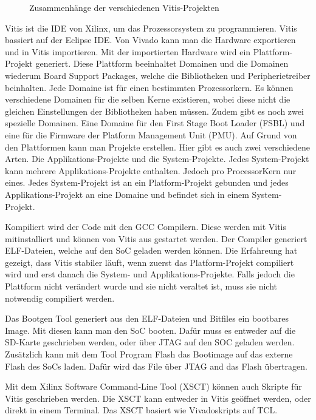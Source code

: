 \documentclass{article}
\begin{document}
\begin{figure}[tb]
    \caption{Zusammenhänge der verschiedenen Vitis-Projekten}
    \label{fig:vitis}
\end{figure}

Vitis ist die IDE von Xilinx, um das Prozessorsystem zu programmieren. Vitis bassiert auf der Eclipse IDE. 
Von Vivado kann man die Hardware exportieren und in Vitis importieren. Mit der importierten Hardware wird ein Plattform-Projekt generiert. Diese Plattform beeinhaltet Domainen und die Domainen wiederum Board Support Packages, welche die Bibliotheken und Peripherietreiber beinhalten. Jede Domaine ist für einen bestimmten Prozessorkern. Es können verschiedene Domainen für die selben Kerne existieren, wobei diese nicht die gleichen Einstellungen der Bibliotheken haben müssen. Zudem gibt es noch zwei spezielle Domainen. Eine Domaine für den First Stage Boot Loader (FSBL) und eine für die Firmware der Platform Management Unit (PMU). Auf Grund von den Plattformen kann man Projekte erstellen. Hier gibt es auch zwei verschiedene Arten. Die Applikations-Projekte und die System-Projekte. Jedes System-Projekt kann mehrere Applikations-Projekte enthalten. Jedoch pro ProcessorKern nur eines. Jedes System-Projekt ist an ein Platform-Projekt gebunden und jedes Applikations-Projekt an eine Domaine und befindet sich in einem System-Projekt.

Kompiliert wird der Code mit den GCC Compilern. Diese werden mit Vitis mitinstalliert und können von Vitis aus gestartet werden. Der Compiler generiert ELF-Dateien, welche auf den SoC geladen werden können. Die Erfahreung hat gezeigt, dass Vitis stabiler läuft, wenn zuerst das Platform-Projekt compiliert wird und erst danach die System- und Applikations-Projekte. Falls jedoch die Plattform nicht verändert wurde und sie nicht veraltet ist, muss sie nicht notwendig compiliert werden.

Das Bootgen Tool generiert aus den ELF-Dateien und Bitfiles ein bootbares Image. Mit diesen kann man den SoC booten. Dafür muss es entweder auf die SD-Karte geschrieben werden, oder über JTAG auf den SOC geladen werden. Zusätzlich kann mit dem Tool Program Flash das Bootimage auf das externe Flash des SoCs laden. Dafür wird das File über JTAG and das Flash übertragen.

Mit dem Xilinx Software Command-Line Tool (XSCT) können auch Skripte für Vitis geschrieben werden. Die XSCT kann entweder in Vitis geöffnet werden, oder direkt in einem Terminal. Das XSCT basiert wie Vivadoskripts auf TCL.
\end{document}
